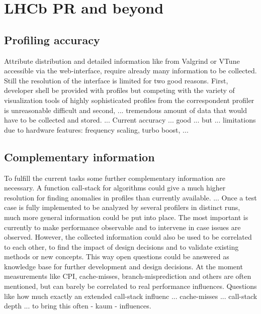 \documentclass[a4paper]{jpconf}
\begin{document}
\section{LHCb PR and beyond}
\label{sec:lhcbpr_and_beyond}

\subsection{Profiling accuracy}
\label{sec:profiling accuracy}

Attribute distribution and detailed information like from Valgrind or VTune accessible via the web-interface, require already many information to be collected. Still the resolution of the interface is limited for two good reasons. First, developer shell be provided with profiles but competing with the variety of visualization tools of highly sophisticated profiles from the correspondent profiler is unreasonable difficult and second, ... tremendous amount of data that would have to be collected and stored. ... Current accuracy ... good ... but ... limitations due to hardware features: frequency scaling, turbo boost, ...

\subsection{Complementary information}
\label{sec:complementary_information}

To fulfill the current tasks some further complementary information are necessary. A function call-stack for algorithms could give a much higher resolution for finding anomalies in profiles than currently available. ...
\newline
Once a test case is fully implemented to be analyzed by several profilers in distinct runs, much more general information could be put into place. The most important is currently to make performance observable and to intervene in case issues are observed. However, the collected information could also be used to be correlated to each other, to find the impact of design decisions and to validate existing methods or new concepts. This way open questions could be answered as knowledge base for further development and design decisions. At the moment measurements like CPI, cache-misses, branch-misprediction and others are often mentioned, but can barely be correlated to real performance influences.
\newline
Questions like how much exactly an extended call-stack influenc ...  cache-misses ... call-stack depth ... to bring this often  - kaum - influences.
\end{document}
